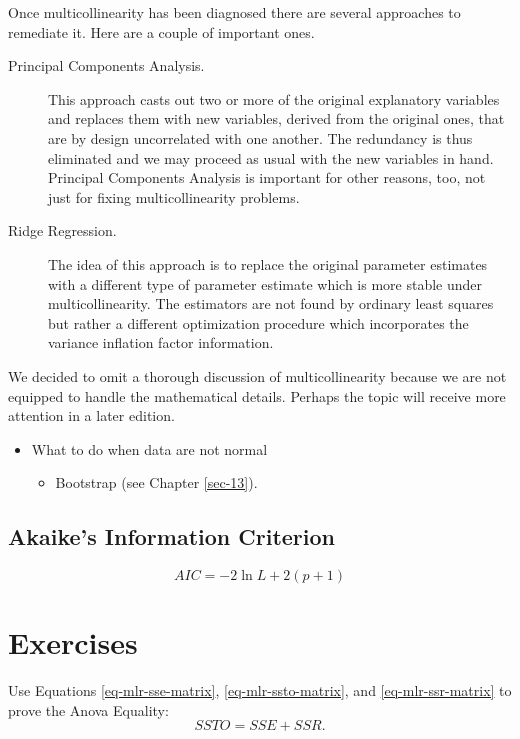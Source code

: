 \documentclass[captions=tableheading]{scrbook}
\begin{document}
Once multicollinearity has been diagnosed there are several approaches to remediate it. Here are a couple of important ones. 
\begin{description}
\item[Principal Components Analysis.] This approach casts out two or more of the original explanatory variables and replaces them with new variables, derived from the original ones, that are by design uncorrelated with one another. The redundancy is thus eliminated and we may proceed as usual with the new variables in hand. Principal Components Analysis is important for other reasons, too, not just for fixing multicollinearity problems.
\item[Ridge Regression.] The idea of this approach is to replace the original parameter estimates with a different type of parameter estimate which is more stable under multicollinearity. The estimators are not found by ordinary least squares but rather a different optimization procedure which incorporates the variance inflation factor information.
\end{description}

We decided to omit a thorough discussion of multicollinearity because we are not equipped to handle the mathematical details. Perhaps the topic will receive more attention in a later edition.

\begin{itemize}
\item What to do when data are not normal
\begin{itemize}
\item Bootstrap (see Chapter \ref{sec-13}).
\end{itemize}
\end{itemize}
\subsection{Akaike's Information Criterion}
\label{sec-12-9-4}


\[
AIC=-2\ln L+2(p+1)
\]


\newpage{}
\section{Exercises}
\label{sec-12-10}


\setcounter{thm}{0}

\begin{xca}
Use Equations \ref{eq-mlr-sse-matrix}, \ref{eq-mlr-ssto-matrix}, and \ref{eq-mlr-ssr-matrix} to prove the Anova Equality:
\[
SSTO=SSE+SSR.
\]
\end{xca}
\end{document}
